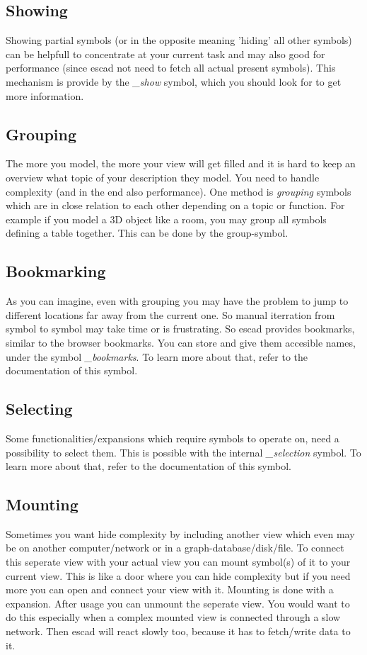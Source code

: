 \documentclass[a4paper, 12pt, openany]{scrbook}
\begin{document}
\subsection{Showing}
Showing partial symbols (or in the opposite meaning 'hiding' all other symbols) can be helpfull to concentrate at your current task and may also good for performance (since escad not need to fetch all actual present symbols). This mechanism is provide by the \emph{\_show} symbol, which you should look for to get more information.
\subsection{Grouping}
The more you model, the more your view will get filled and it is hard to keep an overview what topic of your description they model. You need to handle complexity (and in the end also performance). One method is \emph{grouping} symbols which are in close relation to each other depending on a topic or function. For example if you model a 3D object like a room, you may group all symbols defining a table together. This can be done by the group-symbol.
\subsection{Bookmarking}
As you can imagine, even with grouping you may have the problem to jump to different locations far away from the current one. So manual iterration from symbol to symbol may take time or is frustrating. So escad provides bookmarks, similar to the browser bookmarks. You can store and give them accesible names, under the symbol \emph{\_bookmarks}. To learn more about that, refer to the documentation of this symbol.
\subsection{Selecting}
Some functionalities/expansions which require symbols to operate on, need a possibility to select them. This is possible with the internal \emph{\_selection} symbol. To learn more about that, refer to the documentation of this symbol.
\subsection{Mounting}
Sometimes you want hide complexity by including another view which even may be on another computer/network or in a graph-database/disk/file. To connect this seperate view with your actual view you can mount symbol(s) of it to your current view. This is like a door where you can hide complexity but if you need more you can open and connect your view with it. Mounting is done with a expansion. After usage you can unmount the seperate view. You would want to do this especially when a complex mounted view is connected through a slow network. Then escad will react slowly too, because it has to fetch/write data to it.
\end{document}
